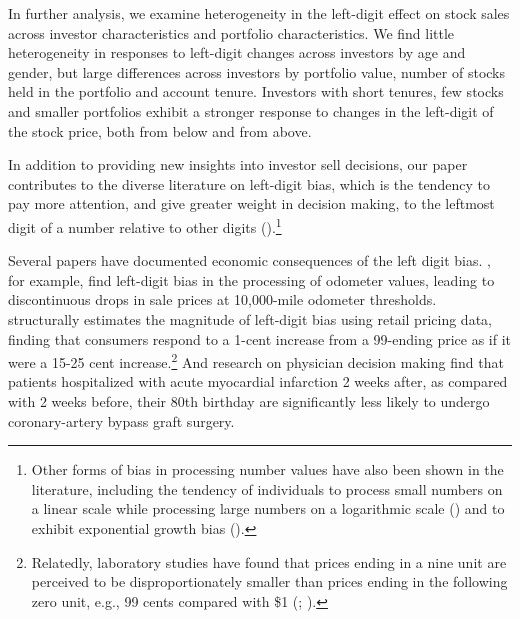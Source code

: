 In further analysis, we examine heterogeneity in the left-digit effect on stock sales across investor characteristics and portfolio characteristics. We find little heterogeneity in responses to left-digit changes across investors by age and gender, but large differences across investors by portfolio value, number of stocks held in the portfolio and account tenure. Investors with short tenures, few stocks and smaller portfolios exhibit a stronger response to changes in the left-digit of the stock price, both from below and from above.

In addition to providing new insights into investor sell decisions, our paper contributes to the diverse literature on left-digit bias, which is the tendency to pay more attention, and give greater weight in decision making, to the leftmost digit of a number relative to other digits (\citealp{poltrock1984comparative}).\footnote{Other forms of bias in processing number values have also been shown in the literature, including the tendency of individuals to process small numbers on a linear scale while processing large numbers on a logarithmic scale (\citealp{roger2018behavioral}) and to exhibit exponential growth bias (\citealp{stango2009exponential}).} 

Several papers have documented economic consequences of the left digit bias. \cite{lacetera2012heuristic}, for example, find left-digit bias in the processing of odometer values, leading to discontinuous drops in sale prices at 10,000-mile odometer thresholds. \cite{shlain2018more} structurally estimates the magnitude of left-digit bias using retail pricing data, finding that consumers respond to a 1-cent increase from a 99-ending price as if it were a 15-25 cent increase.\footnote{Relatedly, laboratory studies have found that prices ending in a nine unit are perceived to be disproportionately smaller than prices ending in the following zero unit, e.g., 99 cents compared with \$1 (\citealp{thomas2005penny}; \citealp{manning2009price}).} And research on physician decision making \citep{olenski2020behavioral} find that patients hospitalized with acute myocardial infarction 2 weeks after, as compared with 2 weeks before, their 80th birthday are significantly less likely to undergo coronary-artery bypass graft surgery.  

